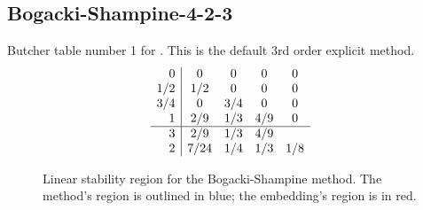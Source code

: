 \documentclass[letterpaper,10pt,english]{sphinxmanual}
\begin{document}
\subsection{Bogacki-Shampine-4-2-3}
\label{Butcher:bogacki-shampine-4-2-3}\label{Butcher:butcher-bogacki-shampine}
Butcher table number 1
for {\hyperref[c_interface/User_callable:ARKodeSetERKTableNum]{}}.  This is
the default 3rd order explicit method.
\begin{gather}
\begin{split}\begin{array}{r|cccc}
  0 &   0 & 0 & 0 & 0 \\
  1/2 & 1/2 & 0 & 0 & 0 \\
  3/4 & 0 & 3/4 & 0 & 0 \\
  1   & 2/9 & 1/3 & 4/9 & 0 \\
  \hline
  3 & 2/9 & 1/3 & 4/9 \\
  2 & 7/24 & 1/4 & 1/3 & 1/8
\end{array}\end{split}\notag
\end{gather}\begin{figure}[htbp]
\centering
\capstart

\caption{Linear stability region for the Bogacki-Shampine method.  The method's
region is outlined in blue; the embedding's region is in red.}\end{figure}
\end{document}
